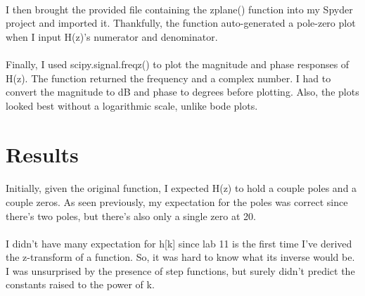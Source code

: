 \documentclass[12pt]{report}
\begin{document}
    \paragraph{} I then brought the provided file containing the zplane() function into my Spyder project and imported it. Thankfully, the function auto-generated a pole-zero plot when I input H(z)'s numerator and denominator. 
    
    \paragraph{} Finally, I used scipy.signal.freqz() to plot the magnitude and phase responses of H(z). The function returned the frequency and a complex number. I had to convert the magnitude to dB and phase to degrees before plotting. Also, the plots looked best without a logarithmic scale, unlike bode plots.
    
\section{Results}

    
    \paragraph{} Initially, given the original function, I expected H(z) to hold a couple poles and a couple zeros. As seen previously, my expectation for the poles was correct since there's two poles, but there's also only a single zero at 20.
    
    \paragraph{} I didn't have many expectation for h[k] since lab 11 is the first time I've derived the z-transform of a function. So, it was hard to know what its inverse would be. I was unsurprised by the presence of step functions, but surely didn't predict the constants raised to the power of k. 
    
\end{document}

